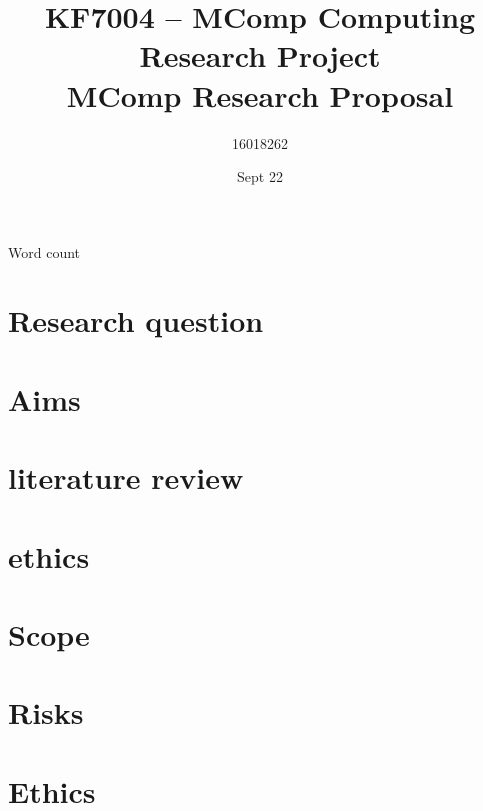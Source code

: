 \documentclass[10pt]{article}
\title{KF7004 – MComp Computing Research Project \\ MComp Research Proposal}
\author{16018262}
\date{Sept 22}
\begin{document}
\maketitle
\begin{center}
	Word count
\end{center}
\tableofcontents
\section{Research question}

\section{Aims}

\section{literature review}

\section{ethics}

\section{Scope}

\section{Risks}


\printbibliography
\appendix
\section{Ethics} \label{ethics}
%
\end{document}
